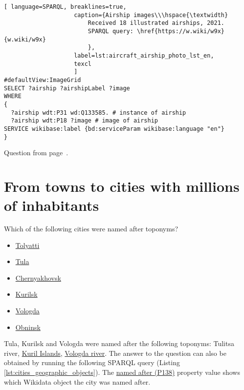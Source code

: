 \begin{lstlisting}[ language=SPARQL, breaklines=true, 
                    caption={Airship images\\\hspace{\textwidth}
						Received 18 illustrated airships, 2021.
                        SPARQL query: \href{https://w.wiki/w9x}{w.wiki/w9x}
                        },
                    label=lst:aircraft_airship_photo_lst_en,
                    texcl 
                    ]
#defaultView:ImageGrid
SELECT ?airship ?airshipLabel ?image
WHERE
{
  ?airship wdt:P31 wd:Q133585. # instance of airship
  ?airship wdt:P18 ?image # image of airship
SERVICE wikibase:label {bd:serviceParam wikibase:language "en"}
}
\end{lstlisting}

Question from page~\pageref{question:aircraft_question_5}.



\section{From towns to cities with millions of inhabitants}

\begin{exercise}%
    \label{answer:cities_geographic_objects}
Which of the following cities were named after toponyms?
\begin{itemize}
\item \href{https://w.wiki/pzi}{Tolyatti}
\item \href{https://w.wiki/pzj}{Tula}
\item \href{https://w.wiki/pzk}{Chernyakhovsk}
\item \href{https://w.wiki/pzm}{Kurilsk}
\item \href{https://w.wiki/pzn}{Vologda}
\item \href{https://w.wiki/pzo}{Obninsk}
\end{itemize}
\end{exercise}

Tula, Kurilsk and Vologda were named after the following toponyms: Tulitsa river, \href{https://w.wiki/qqJ}{Kuril Islands}, \href{https://w.wiki/qqK}{Vologda river}. The answer to the question can also be obtained by running the following SPARQL query (Listing \ref{lst:cities_geographic_objects}). The \href{https://www.wikidata.org/wiki/Property:P138}{named after (P138)} property value shows which Wikidata object the city was named after.
    
